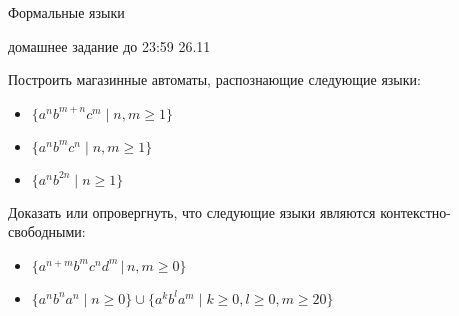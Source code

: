 \documentclass[12pt]{article}
\begin{document}
\begin{center} 
{\LARGE Формальные языки}

{\Large домашнее задание до 23:59 26.11}
\end{center}

\enumerate
{
   \item Построить магазинные автоматы, распознающие следующие языки: 
   
   \begin{itemize}
       \item $\{ a^n b^{m+n} c^m \mid n, m \geq 1 \}$
       \item $\{ a^n b^m c^n \mid n, m \geq 1 \}$
       \item $\{ a^n b^{2n} \mid n \geq 1 \}$
   \end{itemize}
   
   \item Доказать или опровергнуть, что следующие языки являются контекстно-свободными:
   \begin{itemize}
       \item $\{ a^{n+m} b^m c^n d^m \, | \, n, m \geq 0 \}$
       \item $\{ a^n b^n a^n \mid n \geq 0 \} \cup \{ a^k b^l a^m \mid k \geq 0, l \geq 0, m \geq 20\}$
   \end{itemize}
}
\end{document}
